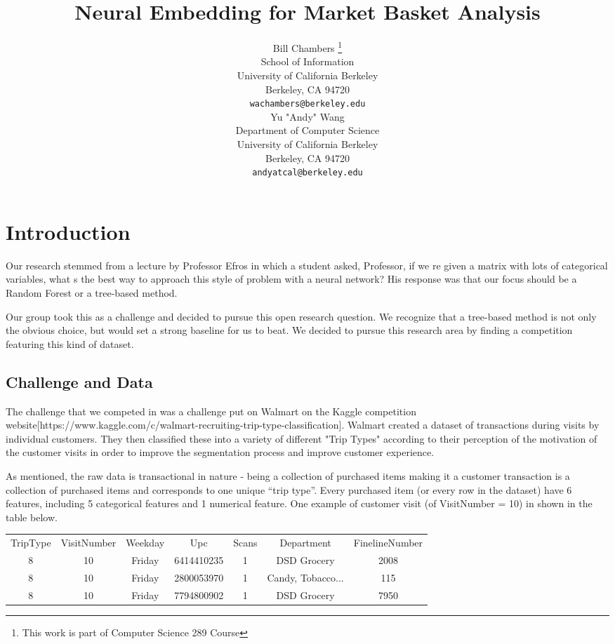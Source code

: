 \documentclass{article} %
\title{Neural Embedding for Market Basket Analysis}
\author{ Bill Chambers \thanks{This work is part of Computer Science 289 Course} \\
School of Information \\
University of California Berkeley\\
Berkeley, CA 94720 \\
\texttt{wachambers@berkeley.edu} \\
\AND
Yu "Andy" Wang \\
Department of Computer Science \\
University of California Berkeley\\
Berkeley, CA 94720 \\
\texttt{andyatcal@berkeley.edu}
}
\begin{document}
\maketitle


\begin{abstract}

\end{abstract}

\section{Introduction}

Our research stemmed from a lecture by Professor Efros in which a student asked,  Professor, if we re given a matrix with lots of categorical variables, what s the best way to approach this style of problem with a neural network?  His response was that our focus should be a Random Forest or a tree-based method. 

Our group took this as a challenge and decided to pursue this open research question. We recognize that a tree-based method is not only the obvious choice, but would set a strong baseline for us to beat. We decided to pursue this research area by finding a competition featuring this kind of dataset.

\subsection{Challenge and Data}

The challenge that we competed in was a challenge put on Walmart on the Kaggle competition website[https://www.kaggle.com/c/walmart-recruiting-trip-type-classification]. Walmart created a dataset of transactions during  visits by individual customers. They then classified these into a variety of different "Trip Types" according to their perception of the motivation of the customer visits in order to improve the segmentation process and improve customer experience.

As mentioned, the raw data is transactional in nature - being a collection of purchased items making it a customer transaction is a collection of purchased items and corresponds to one unique “trip type”. Every purchased item (or every row in the dataset) have 6 features, including 5 categorical features and 1 numerical feature. One example of customer visit (of VisitNumber = 10) in shown in the table below.

\begin{center}
  \begin{tabular}{ c | c | c | c | c | c | c}
    TripType & VisitNumber & Weekday & Upc & Scans & Department & FinelineNumber \\
 8 & 10 & Friday & 6414410235 & 1 & DSD Grocery & 2008 \\
 8 & 10 & Friday & 2800053970 & 1 & Candy, Tobacco... & 115 \\
 8 & 10 & Friday & 7794800902 & 1 & DSD Grocery & 7950 \\
  \end{tabular}
\end{center}
\end{document}
